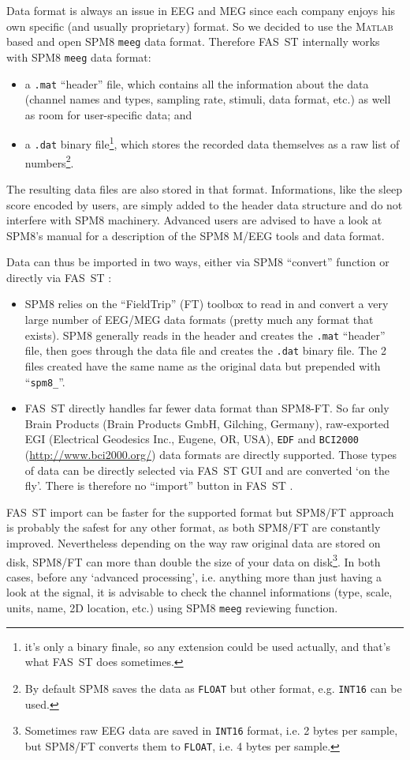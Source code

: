 \documentclass[a4paper,titlepage]{article}
\def\dblS{\hbox{S\hskip -4.5pt S}}
\def\dblSs{\hbox{S\hskip -3.5pt S}}
\newcommand{\bi}{\begin{itemize}}
\newcommand{\ei}{\end{itemize}}
\newcommand{\matlab}{\textsc{Matlab }}
\newcommand{\fasst}{FA\dblS T } 	%
\newcommand{\ffasst}{FA\dblSs T } %
\begin{document}
Data format is always an issue in EEG and MEG since each company enjoys his own specific (and usually proprietary) format. So we decided to use the \matlab based and open SPM8 {\tt meeg} data format. Therefore \fasst internally works with SPM8 {\tt meeg} data format:
\bi
\item a {\tt .mat} ``header'' file, which contains all the information about the data (channel names and types, sampling rate, stimuli, data format, etc.) as well as room for user-specific data; and
\item a {\tt .dat} binary file\footnote{it's only a binary finale, so any extension could be used actually, and that's what \ffasst does sometimes.}, which  stores the recorded data themselves as a raw list of numbers\footnote{By default SPM8 saves the data as {\tt FLOAT} but other format, e.g. {\tt INT16} can be used.}.
\ei
The resulting data files are also stored in that format.  Informations, like the sleep score encoded by users, are simply added to the header data structure and do not interfere with SPM8 machinery. Advanced users are advised to have a look at SPM8's manual for a description of the SPM8 M/EEG tools and data format.

 Data can thus be imported in two ways, either via SPM8 ``convert'' function or directly via \fasst\hspace{-4pt}: 
\bi
\item SPM8 relies on the ``FieldTrip'' (FT) toolbox \cite{Fieldtrip,Oostenveld2011} to read in and convert a very large number of EEG/MEG data formats (pretty much any format that exists). SPM8 generally reads in the header and creates the {\tt .mat} ``header'' file, then goes through the data file and creates the {\tt .dat} binary file. The 2 files created have the same name as the original data but prepended with ``{\tt spm8\_}''.
\item \fasst directly handles far fewer data format than SPM8-FT. So far only Brain Products  (Brain Products GmbH, Gilching, Germany), raw-exported EGI (Electrical Geodesics Inc., Eugene, OR, USA), {\tt EDF} \cite{Kemp1992,Kemp2003,EDF} and {\tt BCI2000} (\url{http://www.bci2000.org/}) data formats are directly supported. Those types of data can be directly selected via \fasst GUI and are converted `on the fly'. There is therefore no ``import'' button in \fasst\hspace{-4pt}.
\ei

\fasst import can be faster for the supported format but SPM8/FT approach is probably the safest for any other format, as both SPM8/FT are constantly improved. Nevertheless depending on the way raw original data are stored on disk, SPM8/FT can more than double the size of your data on disk\footnote{Sometimes raw EEG data are saved in {\tt INT16} format, i.e. 2 bytes per sample, but SPM8/FT converts them to {\tt FLOAT}, i.e. 4 bytes per sample.}.
In both cases, before any `advanced processing', i.e. anything more than just having a look at the signal, it is advisable to check the channel informations (type, scale, units, name, 2D location, etc.) using SPM8 {\tt meeg} reviewing function.
\end{document}
